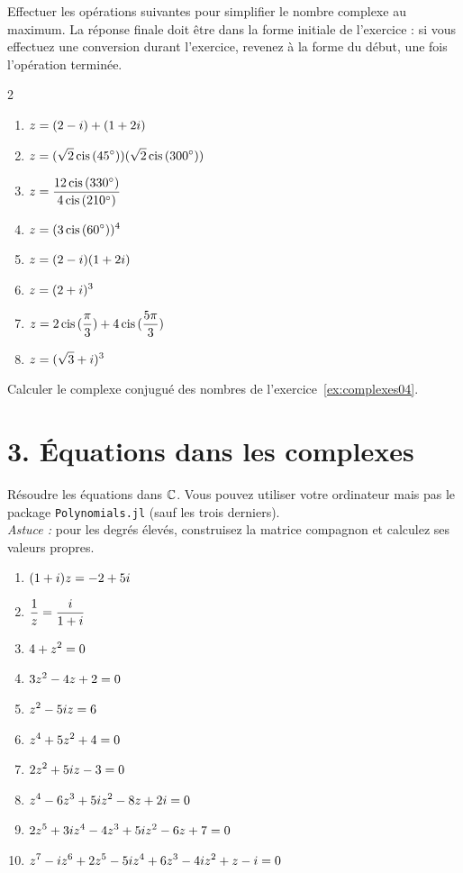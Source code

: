 \begin{exercise}
    \label{ex:complexes04}
    Effectuer les opérations suivantes pour simplifier le nombre complexe au maximum. La réponse finale doit être dans la forme initiale de l'exercice : si vous effectuez une conversion durant l'exercice, revenez à la forme du début, une fois l'opération terminée.
    \begin{multicols}{2}
    \begin{enumerate}[label=(\alph*)]
        \item $\displaystyle z = (2 - i) + (1 + 2i)$
        \item $\displaystyle z = (\sqrt2\operatorname{cis}{(45^\circ)})(\sqrt2\operatorname{cis}{(300^\circ)})$
        \item $\displaystyle z = \frac{12\operatorname{cis}{(330^\circ)}}{4\operatorname{cis}{(210^\circ)}}$
        \item $\displaystyle z = (3\operatorname{cis}{(60^\circ)})^4$
        \item $\displaystyle z = (2 - i)(1 + 2i)$
        \item $\displaystyle z = (2 + i)^3$
        \item $\displaystyle z = 2\operatorname{cis}{(\frac\pi3)} + 4\operatorname{cis}{(\frac{5\pi}3)}$
        \item $\displaystyle z = (\sqrt3 + i)^3$
    \end{enumerate}
    \end{multicols}
\end{exercise}

\begin{exercise}
    Calculer le complexe conjugué des nombres de l'exercice~\ref{ex:complexes04}.
\end{exercise}

\section*{3. Équations dans les complexes}
\begin{exercise}
    Résoudre les équations dans $\mathbb{C}$. Vous pouvez utiliser votre ordinateur mais pas le package \texttt{Polynomials.jl} (sauf les trois derniers). \\
    \textit{Astuce :} pour les degrés élevés, construisez la matrice compagnon et 
    calculez ses valeurs propres. 
    \begin{enumerate}[label=(\alph*)]
        \item $\displaystyle (1 + i)z = -2 + 5i$
        \item $\displaystyle \frac1z = \frac{i}{1+i}$
        \item $\displaystyle 4 + z^2 = 0$
        \item $\displaystyle 3z^2 - 4z + 2 = 0$
        \item $\displaystyle z^2 - 5iz = 6$
        \item $\displaystyle z^4 + 5z^2 + 4 = 0$
        \item $\displaystyle 2z^2 + 5iz - 3 = 0$
        \item $\displaystyle z^4 - 6z^3 + 5iz^2 - 8z + 2i = 0$
        \item $\displaystyle 2z^5 + 3iz^4 - 4z^3 + 5iz^2 - 6z + 7 = 0$
        \item $\displaystyle z^7 - iz^6 + 2z^5 - 5iz^4 + 6z^3 - 4iz^2 + z - i = 0$
    \end{enumerate}
\end{exercise}

